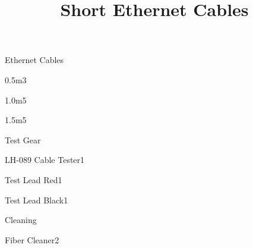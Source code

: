 \def\papersize{5}




\title{Short Ethernet Cables}

\begin{checklist}{Ethernet Cables}
  \item{0.5m}{3}
  \item{1.0m}{5}
  \item{1.5m}{5}
\end{checklist}

\begin{checklist}{Test Gear}
  \item{LH-089 Cable Tester}{1}
  \item{Test Lead Red}{1}
  \item{Test Lead Black}{1}
\end{checklist}

\begin{checklist}{Cleaning}
  \item{Fiber Cleaner}{2}
\end{checklist}


